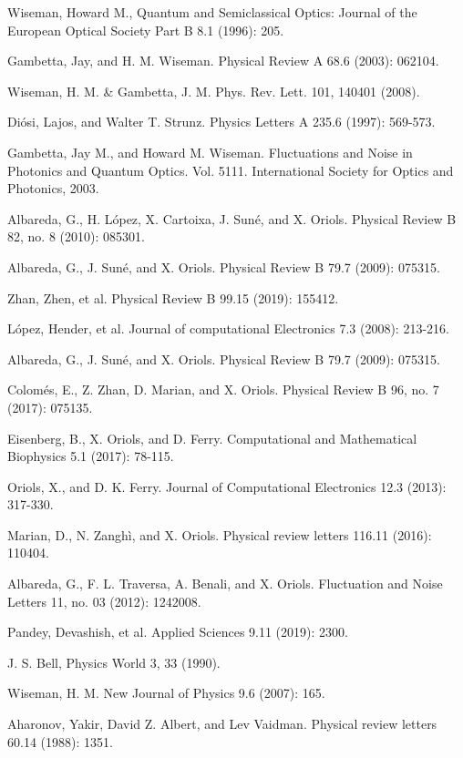 \documentclass[11pt, a4paper]{article} %
\begin{document}
\begin{thebibliography}{1}
{
Wiseman, Howard M., Quantum and Semiclassical Optics: Journal of the European Optical Society Part B 8.1 (1996): 205.

Gambetta, Jay, and H. M. Wiseman. Physical Review A 68.6 (2003): 062104.

Wiseman, H. M. \& Gambetta, J. M. Phys. Rev. Lett. 101, 140401 (2008).

Diósi, Lajos, and Walter T. Strunz. Physics Letters A 235.6 (1997): 569-573.

Gambetta, Jay M., and Howard M. Wiseman. Fluctuations and Noise in Photonics and Quantum Optics. Vol. 5111. International Society for Optics and Photonics, 2003.

Albareda, G., H. López, X. Cartoixa, J. Suné, and X. Oriols. Physical Review B 82, no. 8 (2010): 085301.

Albareda, G., J. Suné, and X. Oriols. Physical Review B 79.7 (2009): 075315.

Zhan, Zhen, et al. Physical Review B 99.15 (2019): 155412.

López, Hender, et al. Journal of computational Electronics 7.3 (2008): 213-216.

Albareda, G., J. Suné, and X. Oriols. Physical Review B 79.7 (2009): 075315.

Colomés, E., Z. Zhan, D. Marian, and X. Oriols. Physical Review B 96, no. 7 (2017): 075135.

Eisenberg, B., X. Oriols, and D. Ferry. Computational and Mathematical Biophysics 5.1 (2017): 78-115.

Oriols, X., and D. K. Ferry. Journal of Computational Electronics 12.3 (2013): 317-330.

Marian, D., N. Zanghì, and X. Oriols. Physical review letters 116.11 (2016): 110404.

Albareda, G., F. L. Traversa, A. Benali, and X. Oriols. Fluctuation and Noise Letters 11, no. 03 (2012): 1242008.

Pandey, Devashish, et al. Applied Sciences 9.11 (2019): 2300.

J. S. Bell, Physics World 3, 33 (1990).

Wiseman, H. M. New Journal of Physics 9.6 (2007): 165.

Aharonov, Yakir, David Z. Albert, and Lev Vaidman. Physical review letters 60.14 (1988): 1351.

}
\end{thebibliography}
\end{document}
